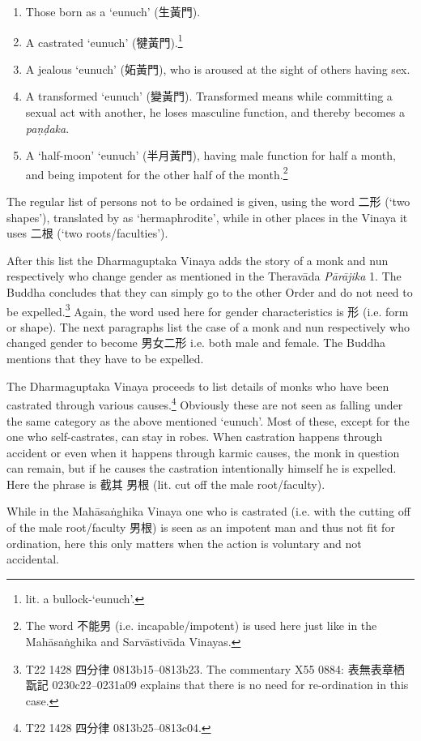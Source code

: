 \begin{enumerate}
\item Those born as a `eunuch' (生黃門). 
\item A castrated `eunuch' (犍黃門).\footnote{lit. a bullock-`eunuch'.}
\item A jealous `eunuch' (妬黃門), who is aroused at the sight of others having sex.
\item A transformed `eunuch' (變黃門). Transformed means while committing a sexual act with another, he loses masculine function, and thereby becomes a {\em paṇḍaka}.
\item A `half-moon' `eunuch' (半月黃門), having male function for half a month, and being impotent for the other half of the month.\footnote{The word 不能男 (i.e. incapable/impotent) is used here just like in the Mahāsaṅghika and Sarvāstivāda Vinayas.}
\end{enumerate}

The regular list of persons not to be ordained is given, using the word 二形 (`two shapes'), translated by \cite{bodhi} as `hermaphrodite', while in other places in the Vinaya it uses 二根 (`two roots/faculties'). 

After this list the Dharmaguptaka Vinaya adds the story of a monk and nun respectively who change gender as mentioned in the Theravāda {\em Pārājika} 1. The Buddha concludes that they can simply go to the other Order and do not need to be expelled.\footnote{T22 1428 四分律 0813b15–0813b23. The commentary X55 0884: 表無表章栖翫記 0230c22–0231a09 explains that there is no need for re-ordination in this case.} Again, the word used here for gender characteristics is 形 (i.e. form or shape). The next paragraphs list the case of a monk and nun respectively who changed gender to become 男女二形 i.e. both male and female. The Buddha mentions that they have to be expelled.

The Dharmaguptaka Vinaya proceeds to list details of monks who have been castrated through various causes.\footnote{T22 1428 四分律 0813b25–0813c04.} Obviously these are not seen as falling under the same category as the above mentioned `eunuch'. Most of these, except for the one who self-castrates, can stay in robes. When castration happens through accident or even when it happens through karmic causes, the monk in question can remain, but if he causes the castration intentionally himself he is expelled. Here the phrase is 截其 男根 (lit. cut off the male root/faculty).

While in the Mahāsaṅghika Vinaya one who is castrated (i.e. with the cutting off of the male root/faculty 男根) is seen as an impotent man and thus not fit for ordination, here this only matters when the action is voluntary and not accidental.

